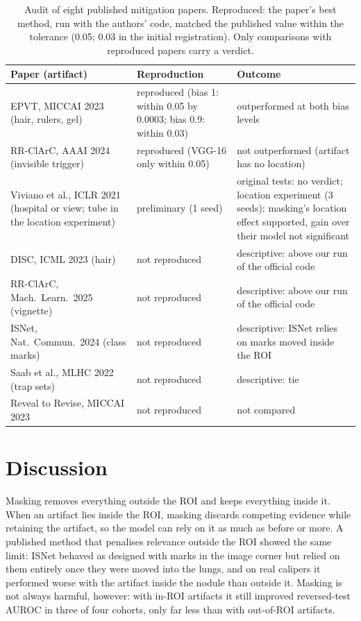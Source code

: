\documentclass[12pt]{article}
\begin{document}
\begin{table}[t]\centering\footnotesize
\caption{Audit of eight published mitigation papers. Reproduced: the paper's best method, run with the authors' code,
matched the published value within the tolerance (0.05; 0.03 in the initial registration). Only comparisons with
reproduced papers carry a verdict.}\label{tab:repl}
\begin{tabular}{>{\raggedright\arraybackslash}p{4.8cm}>{\raggedright\arraybackslash}p{3.0cm}>{\raggedright\arraybackslash}p{5.6cm}}\toprule
Paper (artifact) & Reproduction & Outcome\\\midrule
EPVT, MICCAI 2023 \cite{yan2023epvt} (hair, rulers, gel) & reproduced (bias 1: within 0.05 by 0.0003; bias 0.9: within 0.03) & outperformed at both bias levels\\
RR-ClArC, AAAI 2024 \cite{dreyer2024hope} (invisible trigger) & reproduced (VGG-16 only within 0.05) & not outperformed (artifact has no location)\\
Viviano et al., ICLR 2021 \cite{viviano2021saliency} (hospital or view; tube in the location experiment) & preliminary (1 seed) & original tests: no verdict; location experiment (3 seeds): masking's location effect supported, gain over their model not significant\\
DISC, ICML 2023 \cite{wu2023disc} (hair) & not reproduced & descriptive: above our run of the official code\\
RR-ClArC, Mach.\ Learn.\ 2025 \cite{pahde2025ensuring} (vignette) & not reproduced & descriptive: above our run of the official code\\
ISNet, Nat.\ Commun.\ 2024 \cite{bassi2024isnet} (class marks) & not reproduced & descriptive: ISNet relies on marks moved inside the ROI\\
Saab et al., MLHC 2022 \cite{saab2022spatial} (trap sets) & not reproduced & descriptive: tie\\
Reveal to Revise, MICCAI 2023 \cite{pahde2023r2r} & not reproduced & not compared\\
\bottomrule\end{tabular}\end{table}

\section*{Discussion}
Masking removes everything outside the ROI and keeps everything inside it. When an artifact lies inside the ROI, masking
discards competing evidence while retaining the artifact, so the model can rely on it as much as before or more. A
published method that penalises relevance outside the ROI showed the same limit: ISNet behaved as designed with marks in
the image corner but relied on them entirely once they were moved into the lungs, and on real calipers it performed worse
with the artifact inside the nodule than outside it. Masking is not always harmful, however: with in-ROI artifacts it
still improved reversed-test AUROC in three of four cohorts, only far less than with out-of-ROI artifacts.
\end{document}
